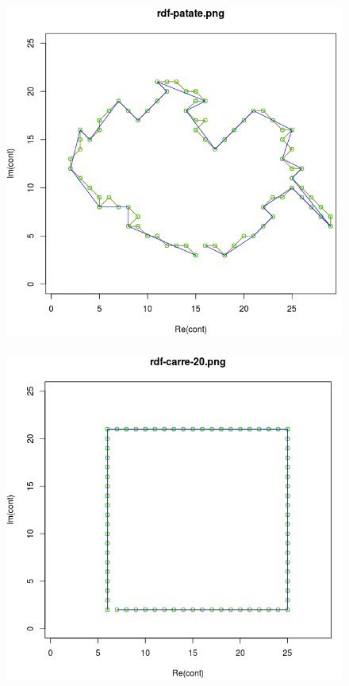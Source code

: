 \documentclass[a4paper,12pt]{report}
\begin{document}
\begin{figure}[!ht]
	\hbox{ 
     	\hspace*{1cm}
		\includegraphics[scale=0.3]{image/fourier6.png}
     	\hspace*{1cm}
		\includegraphics[scale=0.3]{image/fourier7.png}
}
\end{figure}
\end{document}
